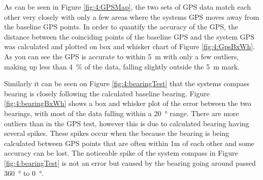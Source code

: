 As can be seen in Figure \ref{fig:4:GPSMap}, the two sets of GPS data match each other very closely with only a few areas where the systems GPS moves away from the baseline GPS points. In order to quantify the accuracy of the GPS, the distance between the coinciding points of the baseline GPS and the system GPS was calculated and plotted on box and whisker chart of Figure \ref{fig:4:GpsBxWh}. As you can see the GPS is accurate to within \SI{5}{\meter} with only a few outliers, making up less than \SI{4}{\percent} of the data, falling slightly outside the \SI{5}{\meter} mark.\par
Similarly it can be seen on Figure \ref{fig:4:bearingTest} that the systems compass bearing is closely following the calculated baseline bearing. Figure \ref{fig:4:bearingBxWh} shows a box and whisker plot of the error between the two bearings, with most of the data falling within a \SI{20}{\degree} range. There are more outliers than in the GPS test, however this is due to calculated bearing having several spikes. These spikes occur when the because the bearing is being calculated between GPS points that are often within 1m of each other and some accuracy can be lost. The noticeable spike of the system compass in Figure \ref{fig:4:bearingTest} is not an error but caused by the bearing going around passed \SI{360}{\degree} to \SI{0}{\degree}.

